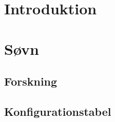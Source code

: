 %
%
%
%
% 



\pagestyle{empty} %
%
%

\newpage

\cleardoublepage

%

\renewcommand{\contentsname}{Indholdsfortegnelse}
\pagestyle{fancy} %
\setcounter{tocdepth}{1}
\tableofcontents
\listoftodos
%
\cleardoublepage

\chapter{Introduktion}


\chapter{Søvn}


\section{Forskning}

\section{Konfigurationstabel}

